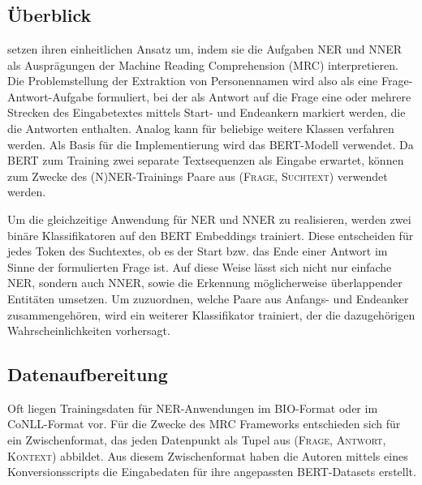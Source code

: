 

\chapter{}
\label{ch:MRC}


\section{Überblick}
\label{ch:MRC:sec:Überblick}

 setzen ihren einheitlichen Ansatz um, indem sie die Aufgaben NER und NNER als Ausprägungen der Machine Reading Comprehension (MRC) interpretieren. Die Problemstellung der Extraktion von Personennamen wird also als eine Frage-Antwort-Aufgabe formuliert, bei der als Antwort auf die Frage \emph{} eine oder mehrere Strecken des Eingabetextes mittels Start- und Endeankern markiert werden, die die Antworten enthalten. Analog kann für beliebige weitere Klassen verfahren werden. Als Basis für die Implementierung wird das BERT-Modell \parencite{devlin2019bert} verwendet. Da BERT zum Training zwei separate Textsequenzen als Eingabe erwartet, können zum Zwecke des (N)NER-Trainings Paare aus \textsc{(Frage, Suchtext)} verwendet werden.

Um die gleichzeitige Anwendung für NER und NNER zu realisieren, werden zwei binäre Klassifikatoren auf den BERT Embeddings trainiert. Diese entscheiden für jedes Token des Suchtextes, ob es der Start bzw. das Ende einer Antwort im Sinne der formulierten Frage ist. Auf diese Weise lässt sich nicht nur einfache NER, sondern auch NNER, sowie die Erkennung möglicherweise überlappender Entitäten umsetzen. Um zuzuordnen, welche Paare aus Anfangs- und Endeanker zusammengehören, wird ein weiterer Klassifikator trainiert, der die dazugehörigen Wahrscheinlichkeiten vorhersagt.

\section{Datenaufbereitung}
\label{ch:MRC:sec:Datenaufbereitung}

Oft liegen Trainingsdaten für NER-Anwendungen im BIO-Format oder im CoNLL-Format vor. Für die Zwecke des MRC Frameworks entschieden sich  für ein Zwischenformat, das jeden Datenpunkt als Tupel aus \textsc{(Frage, Antwort, Kontext)} abbildet. Aus diesem Zwischenformat haben die Autoren mittels eines Konversionsscripts die Eingabedaten für ihre angepassten BERT-Datasets erstellt.

